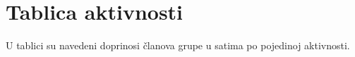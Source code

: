\begin{packed_enum}
			
		
		
		
		\end{packed_enum}
		
		
		
		\eject
		\section*{Tablica aktivnosti}
		
			\vspace{-0.1cm}
			
			U tablici su navedeni doprinosi članova grupe u satima po pojedinoj aktivnosti. 
		

